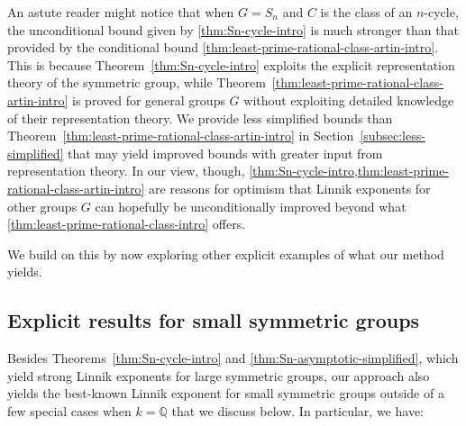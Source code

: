 \documentclass[12pt]{amsart}
\theoremstyle{definition} \newtheorem{definition}[theorem]{Definition}
\theoremstyle{example} \newtheorem{example}[theorem]{Example}
\theoremstyle{remark} \newtheorem{remark}{Remark}[theorem]
\numberwithin{equation}{section}
\numberwithin{theorem}{section}
\begin{document}
	An astute reader might notice that when $G = S_n$ and $C$ is the class of an $n$-cycle, the unconditional bound given by \cref{thm:Sn-cycle-intro} is much stronger than that provided by the conditional bound \cref{thm:least-prime-rational-class-artin-intro}.  This is because Theorem~\ref{thm:Sn-cycle-intro} exploits the explicit representation theory of the symmetric group, while Theorem~\ref{thm:least-prime-rational-class-artin-intro} is proved for general groups $G$ without exploiting detailed knowledge of their representation theory. 
	We provide less simplified bounds than Theorem~\ref{thm:least-prime-rational-class-artin-intro} in Section~\ref{subsec:less-simplified} that may yield improved bounds with greater input from representation theory.  
	In our view, though, \cref{thm:Sn-cycle-intro,thm:least-prime-rational-class-artin-intro} are reasons for optimism that Linnik exponents for other groups $G$ can hopefully be unconditionally improved beyond what \cref{thm:least-prime-rational-class-intro} offers.
	
	We build on this by now exploring other explicit examples of what our method yields.

\subsection{Explicit results for small symmetric groups} 
	\label{subsec:small-groups-intro}

	Besides Theorems~\ref{thm:Sn-cycle-intro} and \ref{thm:Sn-asymptotic-simplified}, which yield strong Linnik exponents for large symmetric groups, our approach also yields the best-known Linnik exponent for small symmetric groups outside of a few special cases when $k=\mathbb{Q}$ that we discuss below.  In particular, we have:
	
\end{document}
